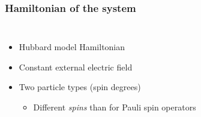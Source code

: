     \begin{frame}[t]
        \frametitle{Hamiltonian of the system}
        
        \begin{columns}[t]
                \begin{itemize}
                    \item Hubbard model Hamiltonian \pause
                    \item Constant external electric field \pause
                    \item Two particle types (spin degrees) \pause
                    \begin{itemize}
                        \item Different \emph{spins} than for Pauli spin operators
                    \end{itemize}
                \end{itemize}
    
            \onslide
                \vspace{-0.0cm}
    
        \end{columns}

        \onslide %
    \end{frame}

